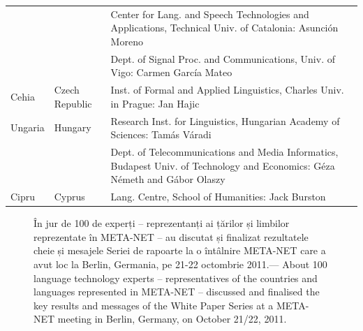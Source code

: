 \documentclass[]{../../metanetpaper}
\begin{document}
\begin{longtable}{llp{105mm}}
  & & Center for Lang. and Speech Technologies and Applications, Technical Univ. of Catalonia: Asunción Moreno \\ \addlinespace 
  & & Dept. of Signal Proc. and Communications, Univ. of Vigo: Carmen García Mateo \\ \addlinespace 
  Cehia & \textcolor{grey1}{Czech Republic} & Inst. of Formal and Applied Linguistics, Charles Univ. in Prague: Jan Hajic \\ \addlinespace
  Ungaria & \textcolor{grey1}{Hungary} & Research Inst. for Linguistics, Hungarian Academy of Sciences: Tamás Váradi\\  \addlinespace
  & & Dept. of Telecommunications and Media Informatics, Budapest Univ. of Technology and Economics: Géza Németh and Gábor Olaszy\\ \addlinespace
  Cipru & \textcolor{grey1}{Cyprus} & Lang. Centre, School of Humanities: Jack Burston
\end{longtable}
\normalsize

\renewcommand*{\figureformat}{}
\renewcommand*{\captionformat}{}

\begin{figure}[htbp]
  \center
  \caption{În jur de 100 de experți -- reprezentanți ai țărilor și limbilor reprezentate în META-NET -- au discutat și finalizat rezultatele cheie și mesajele Seriei de rapoarte la o întâlnire META-NET care a avut loc la Berlin, Germania, pe 21-22 octombrie 2011.--- \textcolor{grey1}{About 100 language technology experts -- representatives of the countries and languages represented in META-NET -- discussed and finalised the key results and messages of the White Paper Series at a META-NET meeting in Berlin, Germany, on October 21/22, 2011.}}
\end{figure}

\cleardoublepage

\label{whitepaperseries}
\end{document}

